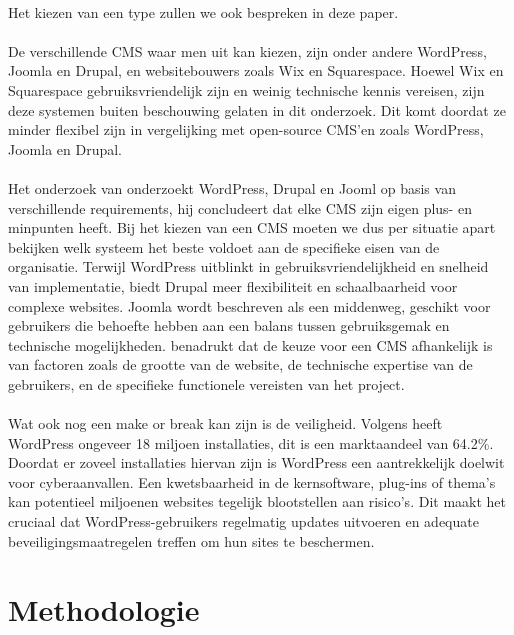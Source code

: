 \\
Het kiezen van een type zullen we ook bespreken in deze paper.
\\ \\
De verschillende CMS waar men uit kan kiezen, zijn onder andere WordPress, Joomla en Drupal, en websitebouwers zoals Wix en Squarespace. Hoewel Wix en Squarespace gebruiksvriendelijk zijn en weinig technische kennis vereisen, zijn deze systemen buiten beschouwing gelaten in dit onderzoek. Dit komt doordat ze minder flexibel zijn in vergelijking met open-source CMS'en zoals WordPress, Joomla en Drupal.
\\ \\
Het onderzoek van \textcite{Khalil2024} onderzoekt WordPress, Drupal en Jooml op basis van verschillende requirements, hij concludeert dat elke CMS zijn eigen plus- en minpunten heeft. Bij het kiezen van een CMS moeten we dus per situatie apart bekijken welk systeem het beste voldoet aan de specifieke eisen van de organisatie. Terwijl WordPress uitblinkt in gebruiksvriendelijkheid en snelheid van implementatie, biedt Drupal meer flexibiliteit en schaalbaarheid voor complexe websites. Joomla wordt beschreven als een middenweg, geschikt voor gebruikers die behoefte hebben aan een balans tussen gebruiksgemak en technische mogelijkheden. \textcite{Khalil2024} benadrukt dat de keuze voor een CMS afhankelijk is van factoren zoals de grootte van de website, de technische expertise van de gebruikers, en de specifieke functionele vereisten van het project.
\\ \\
Wat ook nog een make or break kan zijn is de veiligheid. Volgens \textcite{MarianVladut2021} heeft WordPress ongeveer 18 miljoen installaties, dit is een marktaandeel van 64.2\%. Doordat er zoveel installaties hiervan zijn is WordPress een aantrekkelijk doelwit voor cyberaanvallen. Een kwetsbaarheid in de kernsoftware, plug-ins of thema's kan potentieel miljoenen websites tegelijk blootstellen aan risico's. Dit maakt het cruciaal dat WordPress-gebruikers regelmatig updates uitvoeren en adequate beveiligingsmaatregelen treffen om hun sites te beschermen.


\section{Methodologie}%
\label{sec:methodologie}

